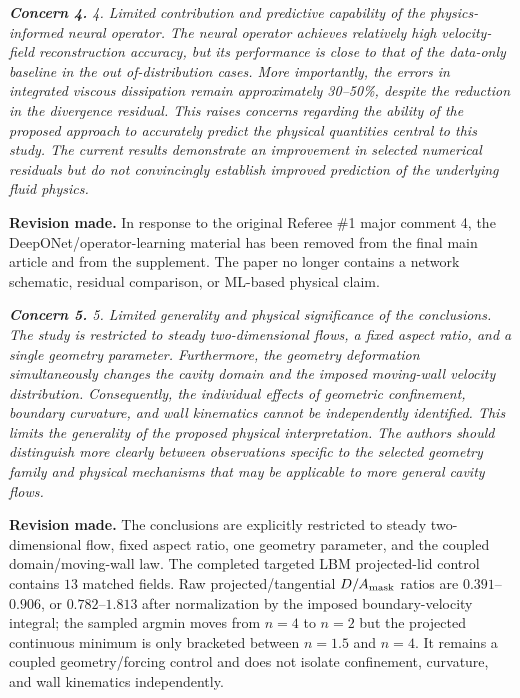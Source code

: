 \documentclass[11pt,a4paper]{article}
\newcommand{\qcomment}[1]{\textcolor{deepblue}{\itshape #1}}
\newcommand{\revwork}[1]{\textbf{\textcolor{revgreen}{#1}}}
\begin{document}
\medskip
\noindent\qcomment{\textbf{Concern 4.} 4. Limited contribution and predictive capability of the physics-informed neural operator. The neural operator achieves relatively high velocity-field reconstruction accuracy, but its performance is close to that of the data-only baseline in the out of-distribution cases. More importantly, the errors in integrated viscous dissipation remain approximately 30--50\%, despite the reduction in the divergence residual. This raises concerns regarding the ability of the proposed approach to accurately predict the physical quantities central to this study. The current results demonstrate an improvement in selected numerical residuals but do not convincingly establish improved prediction of the underlying fluid physics.}

\noindent\revwork{Revision made.} In response to the original Referee \#1 major comment 4, the DeepONet/operator-learning material has been removed from the final main article and from the supplement. The paper no longer contains a network schematic, residual comparison, or ML-based physical claim.

\medskip
\noindent\qcomment{\textbf{Concern 5.} 5. Limited generality and physical significance of the conclusions. The study is restricted to steady two-dimensional flows, a fixed aspect ratio, and a single geometry parameter. Furthermore, the geometry deformation simultaneously changes the cavity domain and the imposed moving-wall velocity distribution. Consequently, the individual effects of geometric confinement, boundary curvature, and wall kinematics cannot be independently identified. This limits the generality of the proposed physical interpretation. The authors should distinguish more clearly between observations specific to the selected geometry family and physical mechanisms that may be applicable to more general cavity flows.}

\noindent\revwork{Revision made.} The conclusions are explicitly restricted to steady two-dimensional flow, fixed aspect ratio, one geometry parameter, and the coupled domain/moving-wall law. The completed targeted LBM projected-lid control contains $13$ matched fields. Raw projected/tangential $D/A_{\rm mask}$ ratios are $0.391$--$0.906$, or $0.782$--$1.813$ after normalization by the imposed boundary-velocity integral; the sampled argmin moves from $n=4$ to $n=2$ but the projected continuous minimum is only bracketed between $n=1.5$ and $n=4$. It remains a coupled geometry/forcing control and does not isolate confinement, curvature, and wall kinematics independently.
\end{document}
